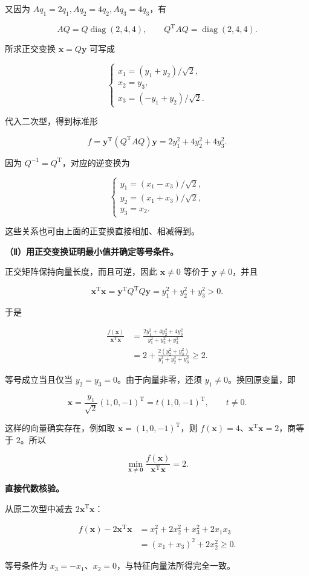 \documentclass[UTF8,11pt,fontset=windows]{ctexart}
\begin{document}
又因为 $Aq_1=2q_1,Aq_2=4q_2,Aq_3=4q_3$，有

$$
AQ=Q\operatorname{diag}(2,4,4),
\qquad Q^{\mathrm T}AQ=\operatorname{diag}(2,4,4).
$$

所求正交变换 $\boldsymbol x=Q\boldsymbol y$ 可写成

$$
\begin{cases}
x_1=(y_1+y_2)/\sqrt2,\\
x_2=y_3,\\
x_3=(-y_1+y_2)/\sqrt2.
\end{cases}
$$

代入二次型，得到标准形

$$
f=\boldsymbol y^{\mathrm T}(Q^{\mathrm T}AQ)\boldsymbol y
=\boxed{2y_1^2+4y_2^2+4y_3^2}.
$$

因为 $Q^{-1}=Q^{\mathrm T}$，对应的逆变换为

$$
\begin{cases}
y_1=(x_1-x_3)/\sqrt2,\\
y_2=(x_1+x_3)/\sqrt2,\\
y_3=x_2.
\end{cases}
$$

这些关系也可由上面的正变换直接相加、相减得到。

\textbf{（Ⅱ）用正交变换证明最小值并确定等号条件。}

正交矩阵保持向量长度，而且可逆，因此 $\boldsymbol x\ne0$ 等价于 $\boldsymbol y\ne0$，并且

$$
\boldsymbol x^{\mathrm T}\boldsymbol x
=\boldsymbol y^{\mathrm T}Q^{\mathrm T}Q\boldsymbol y
=y_1^2+y_2^2+y_3^2>0.
$$

于是

$$
\begin{aligned}
\frac{f(\boldsymbol x)}{\boldsymbol x^{\mathrm T}\boldsymbol x}
&=\frac{2y_1^2+4y_2^2+4y_3^2}{y_1^2+y_2^2+y_3^2}\\
&=2+\frac{2(y_2^2+y_3^2)}{y_1^2+y_2^2+y_3^2}\ge2.
\end{aligned}
$$

等号成立当且仅当 $y_2=y_3=0$。由于向量非零，还须 $y_1\ne0$。换回原变量，即

$$
\boldsymbol x=\frac{y_1}{\sqrt2}(1,0,-1)^{\mathrm T}
=t(1,0,-1)^{\mathrm T},\qquad t\ne0.
$$

这样的向量确实存在，例如取 $\boldsymbol x=(1,0,-1)^{\mathrm T}$，则 $f(\boldsymbol x)=4$、$\boldsymbol x^{\mathrm T}\boldsymbol x=2$，商等于 $2$。所以

$$
\boxed{\min_{\boldsymbol x\ne\boldsymbol0}
\frac{f(\boldsymbol x)}{\boldsymbol x^{\mathrm T}\boldsymbol x}=2}.
$$

\textbf{直接代数核验。}

从原二次型中减去 $2\boldsymbol x^{\mathrm T}\boldsymbol x$：

$$
\begin{aligned}
f(\boldsymbol x)-2\boldsymbol x^{\mathrm T}\boldsymbol x
&=x_1^2+2x_2^2+x_3^2+2x_1x_3\\
&=(x_1+x_3)^2+2x_2^2\ge0.
\end{aligned}
$$

等号条件为 $x_3=-x_1$、$x_2=0$，与特征向量法所得完全一致。
\end{document}
